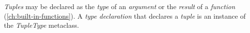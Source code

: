 \emph{Tuples} may be declared as the \emph{type} of
an \emph{argument} or the \emph{result} of a \emph{function} (\ref{ch:built-in-functions}).
A \emph{type declaration} that declares a \emph{tuple}
is an instance of the \emph{TupleType} metaclass.
